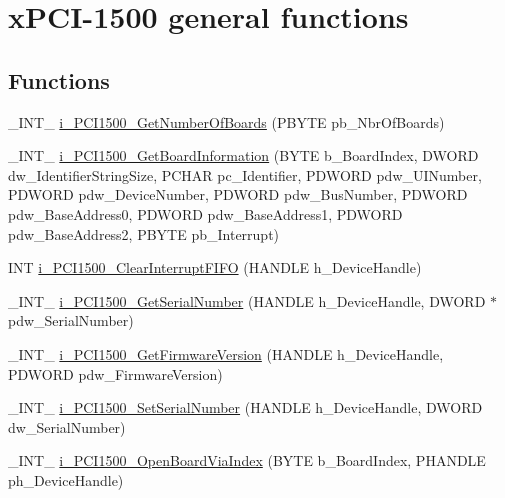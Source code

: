 \hypertarget{group___general}{}\section{x\+P\+C\+I-\/1500 general functions}
\label{group___general}
\subsection*{Functions}
\begin{DoxyCompactItemize}
\item 
\+\_\+\+I\+N\+T\+\_\+ \mbox{\hyperlink{group___general_ga62f69d2b4936fc6cfe75c6ee032d1f58}{i\+\_\+\+P\+C\+I1500\+\_\+\+Get\+Number\+Of\+Boards}} (P\+B\+Y\+TE pb\+\_\+\+Nbr\+Of\+Boards)
\item 
\+\_\+\+I\+N\+T\+\_\+ \mbox{\hyperlink{group___general_gaa7f6b4012cf3a1b83f774d0d3b1d57e5}{i\+\_\+\+P\+C\+I1500\+\_\+\+Get\+Board\+Information}} (B\+Y\+TE b\+\_\+\+Board\+Index, D\+W\+O\+RD dw\+\_\+\+Identifier\+String\+Size, P\+C\+H\+AR pc\+\_\+\+Identifier, P\+D\+W\+O\+RD pdw\+\_\+\+U\+I\+Number, P\+D\+W\+O\+RD pdw\+\_\+\+Device\+Number, P\+D\+W\+O\+RD pdw\+\_\+\+Bus\+Number, P\+D\+W\+O\+RD pdw\+\_\+\+Base\+Address0, P\+D\+W\+O\+RD pdw\+\_\+\+Base\+Address1, P\+D\+W\+O\+RD pdw\+\_\+\+Base\+Address2, P\+B\+Y\+TE pb\+\_\+\+Interrupt)
\item 
I\+NT \mbox{\hyperlink{group___general_gadfb2a5aff9ca05e58de6336f8b29e8c7}{i\+\_\+\+P\+C\+I1500\+\_\+\+Clear\+Interrupt\+F\+I\+FO}} (H\+A\+N\+D\+LE h\+\_\+\+Device\+Handle)
\item 
\+\_\+\+I\+N\+T\+\_\+ \mbox{\hyperlink{group___general_ga19e029e65407a4d996303cae78f0fac9}{i\+\_\+\+P\+C\+I1500\+\_\+\+Get\+Serial\+Number}} (H\+A\+N\+D\+LE h\+\_\+\+Device\+Handle, D\+W\+O\+RD $\ast$pdw\+\_\+\+Serial\+Number)
\item 
\+\_\+\+I\+N\+T\+\_\+ \mbox{\hyperlink{group___general_ga7d7f2ed79ea2bfb214860383b71b475b}{i\+\_\+\+P\+C\+I1500\+\_\+\+Get\+Firmware\+Version}} (H\+A\+N\+D\+LE h\+\_\+\+Device\+Handle, P\+D\+W\+O\+RD pdw\+\_\+\+Firmware\+Version)
\item 
\+\_\+\+I\+N\+T\+\_\+ \mbox{\hyperlink{group___general_gaccd171046bb08480b01e7ea61b5fca12}{i\+\_\+\+P\+C\+I1500\+\_\+\+Set\+Serial\+Number}} (H\+A\+N\+D\+LE h\+\_\+\+Device\+Handle, D\+W\+O\+RD dw\+\_\+\+Serial\+Number)
\item 
\+\_\+\+I\+N\+T\+\_\+ \mbox{\hyperlink{group___general_gaf36014f444cdd1c38c391b145e9dce02}{i\+\_\+\+P\+C\+I1500\+\_\+\+Open\+Board\+Via\+Index}} (B\+Y\+TE b\+\_\+\+Board\+Index, P\+H\+A\+N\+D\+LE ph\+\_\+\+Device\+Handle)

\end{DoxyCompactItemize}
